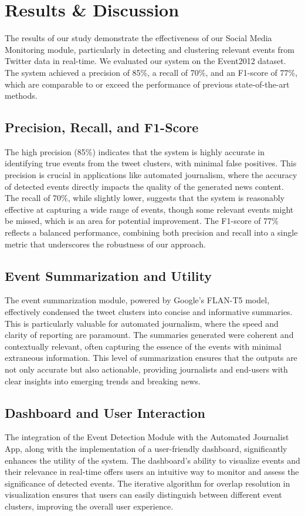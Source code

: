 \section{Results \& Discussion}
The results of our study demonstrate the effectiveness of our Social Media Monitoring module, particularly in detecting and clustering relevant events from Twitter data in real-time. We evaluated our system on the Event2012 dataset. The system achieved a precision of 85\%, a recall of 70\%, and an F1-score of 77\%, which are comparable to or exceed the performance of previous state-of-the-art methods.
\subsection{Precision, Recall, and F1-Score}
The high precision (85\%) indicates that the system is highly accurate in identifying true events from the tweet clusters, with minimal false positives. This precision is crucial in applications like automated journalism, where the accuracy of detected events directly impacts the quality of the generated news content. The recall of 70\%, while slightly lower, suggests that the system is reasonably effective at capturing a wide range of events, though some relevant events might be missed, which is an area for potential improvement. The F1-score of 77\% reflects a balanced performance, combining both precision and recall into a single metric that underscores the robustness of our approach.
\subsection{Event Summarization and Utility}
The event summarization module, powered by Google’s FLAN-T5 model, effectively condensed the tweet clusters into concise and informative summaries. This is particularly valuable for automated journalism, where the speed and clarity of reporting are paramount. The summaries generated were coherent and contextually relevant, often capturing the essence of the events with minimal extraneous information. This level of summarization ensures that the outputs are not only accurate but also actionable, providing journalists and end-users with clear insights into emerging trends and breaking news.

\subsection{Dashboard and User Interaction}
The integration of the Event Detection Module with the Automated Journalist App, along with the implementation of a user-friendly dashboard, significantly enhances the utility of the system. The dashboard's ability to visualize events and their relevance in real-time offers users an intuitive way to monitor and assess the significance of detected events. The iterative algorithm for overlap resolution in visualization ensures that users can easily distinguish between different event clusters, improving the overall user experience.


